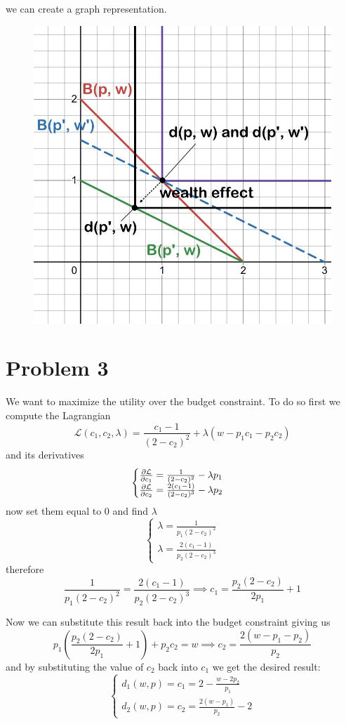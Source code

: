 \documentclass[12pt]{extarticle}
\numberwithin{table}{section}
\numberwithin{figure}{section}
\numberwithin{equation}{section}
\begin{document}
we can create a graph representation.
\begin{figure}[H]
	\centering
	\includegraphics[width=0.5\linewidth]{assets/decision-theory/ps2-ex2.jpg}
\end{figure}


\section*{Problem 3}

We want to maximize the utility over the budget constraint.
To do so first we compute the Lagrangian
\begin{equation}
	\mathcal L(c_1, c_2, \lambda) = \frac{c_1 -1}{(2 - c_2)^2} + \lambda(w - p_1 c_1 - p_2 c_2)
\end{equation}
and its derivatives
\begin{equation}
	\begin{cases}
		\pdv{\mathcal L}{c_1} = \frac{1}{(2-c_2)^2} - \lambda p_1 \\
		\pdv{\mathcal L}{c_2} = \frac{2(c_1 - 1)}{(2-c_2)^3} - \lambda p_2
	\end{cases}
\end{equation}
now set them equal to $0$ and find $\lambda$
\begin{equation}
	\begin{cases}
		\lambda = \frac{1}{p_1 (2-c_2)^2} \\
		\lambda = \frac{2(c_1 - 1)}{p_2 (2-c_2)^3}
	\end{cases}
\end{equation}
therefore
\begin{equation}
	\frac{1}{p_1 (2-c_2)^2} = \frac{2(c_1 - 1)}{p_2 (2-c_2)^3}
	\implies c_1 = \frac{p_2(2-c_2)}{2p_1} + 1
\end{equation}

Now we can substitute this result back into the budget constraint giving us
\begin{equation}
	p_1 \left( \frac{p_2(2-c_2)}{2p_1} + 1 \right) + p_2 c_2 = w
	\implies c_2 = \frac{2(w - p_1 - p_2)}{p_2}
\end{equation}
and by substituting the value of $c_2$ back into $c_1$ we get the desired result:
\begin{equation}
	\begin{cases}
		d_1(w, p) = c_1 = 2 - \frac{w - 2p_2}{p_1} \\
		d_2(w, p) = c_2 = \frac{2(w - p_1)}{p_2} - 2
	\end{cases}
\end{equation}
\end{document}
